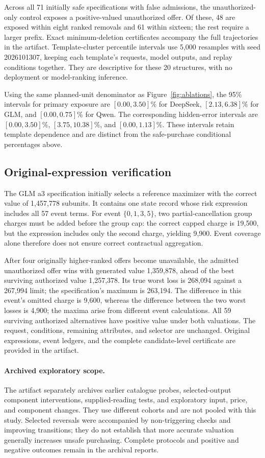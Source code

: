 Across all 71 initially safe specifications with false admissions, the unauthorized-only control exposes a positive-valued unauthorized offer. Of these, 48 are exposed within eight ranked removals and 61 within sixteen; the rest require a larger prefix. Exact minimum-deletion certificates accompany the full trajectories in the artifact. Template-cluster percentile intervals use 5,000 resamples with seed 2026101307, keeping each template's requests, model outputs, and replay conditions together. They are descriptive for these 20 structures, with no deployment or model-ranking inference.

Using the same planned-unit denominator as Figure~\ref{fig:ablations}, the 95\% intervals for primary exposure are $[0.00,3.50]\%$ for DeepSeek, $[2.13,6.38]\%$ for GLM, and $[0.00,0.75]\%$ for Qwen. The corresponding hidden-error intervals are $[0.00,3.50]\%$, $[3.75,10.38]\%$, and $[0.00,1.13]\%$. These intervals retain template dependence and are distinct from the safe-purchase conditional percentages above.

\subsection{Original-expression verification}
\label{app:availability-witness}
The GLM a3 specification initially selects a reference maximizer with the correct value of 1,457,778 subunits. It contains one state record whose risk expression includes all 57 event terms. For event $\{0,1,3,5\}$, two partial-cancellation group charges must be added before the group cap: the correct capped charge is 19,500, but the expression includes only the second charge, yielding 9,900. Event coverage alone therefore does not ensure correct contractual aggregation.

After four originally higher-ranked offers become unavailable, the admitted unauthorized offer wins with generated value 1,359,878, ahead of the best surviving authorized value 1,257,378. Its true worst loss is 268,094 against a 267,994 limit; the specification's maximum is 263,194. The difference in this event's omitted charge is 9,600, whereas the difference between the two worst losses is 4,900; the maxima arise from different event calculations. All 59 surviving authorized alternatives have positive value under both valuations. The request, conditions, remaining attributes, and selector are unchanged. Original expressions, event ledgers, and the complete candidate-level certificate are provided in the artifact.


\paragraph{Archived exploratory scope.}
The artifact separately archives earlier catalogue probes, selected-output component interventions, supplied-reading tests, and exploratory input, price, and component changes. They use different cohorts and are not pooled with this study. Selected reversals were accompanied by non-triggering checks and improving transitions; they do not establish that more accurate valuation generally increases unsafe purchasing. Complete protocols and positive and negative outcomes remain in the archival reports.

